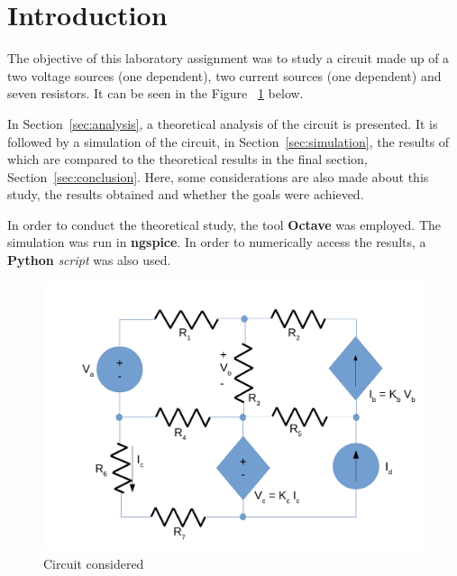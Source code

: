 \section{Introduction}
\label{sec:introduction}

The objective of this laboratory assignment was to study a circuit made up of a two voltage sources (one dependent), two current sources (one dependent) and seven resistors. It can be seen in the Figure ~\ref{circuit} below.

In Section~\ref{sec:analysis}, a theoretical analysis of the circuit is presented. It is followed by a simulation of the circuit, in Section~\ref{sec:simulation}, the results of which are compared to the theoretical results in the final section, Section~\ref{sec:conclusion}. Here, some  considerations are also made about this study, the results obtained and whether the goals were achieved.

In order to conduct the theoretical study, the tool {\bf Octave} was employed. The simulation was run in {\bf ngspice}. In order to numerically access the results, a {\bf Python} {\it script} was also used.


\begin{figure}[H]
  \centering
  \includegraphics[width=0.6\linewidth]{simple.pdf}
  \caption{Circuit considered}
  \label{circuit}
\end{figure}

